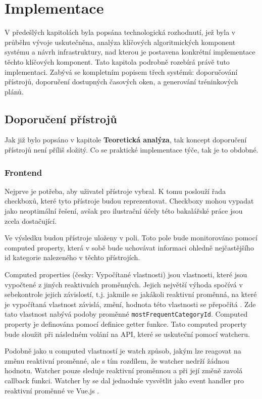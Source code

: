 \chapter{Implementace}
V předešlých kapitolách byla popsána technologická rozhodnutí, jež byla v průběhu vývoje uskutečněna, analýza klíčových algoritmických komponent systému a návrh infrastruktury, nad kterou je postavena konkrétní implementace těchto klíčových komponent. Tato kapitola podrobně rozebírá právě tuto implementaci. Zabývá se kompletním popisem třech systémů: doporučování přístrojů, doporučení dostupných časových oken, a generování tréninkových plánů.

\section{Doporučení přístrojů}
Jak již bylo popsáno v kapitole \textbf{Teoretická analýza}, tak koncept doporučení přístrojů není příliš složitý. Co se praktické implementace týče, tak je to obdobné.

\subsection{Frontend}
Nejprve je potřeba, aby uživatel přístroje vybral. K tomu poslouží řada checkboxů, které tyto přístroje budou reprezentovat. Checkboxy mohou vypadat jako neoptimální řešení, avšak pro ilustrační účely této bakalářské práce jsou zcela dostačující.

Ve výsledku budou přístroje uloženy v poli. Toto pole bude monitorováno pomocí computed property, která v sobě bude uchovávat informaci ohledně nejčastějšího id kategorie nalezeného v těchto přístrojích.

Computed properties (česky: Vypočítané vlastnosti) jsou vlastnosti, které jsou vypočtené z jiných reaktivních proměnných. Jejich největší výhoda spočívá v sebekontrole jejich závislostí, t.j. jakmile se jakákoli reaktivní proměnná, na které je vypočítaná vlastnost závislá, změní, hodnota této vlastnosti se přepočítá \cite{vuejsVuejsComputed}. Zde tato vlastnost nabývá podoby proměnné \texttt{mostFrequentCategoryId}. Computed property je definována pomocí definice getter funkce. Tato computed property bude sloužit při následném volání na API, které se uskuteční pomocí watcheru.

Podobně jako u computed vlastností je watch způsob, jakým lze reagovat na změnu reaktivní proměnné, ale s tím rozdílem, že watcher nedrží žádnou hodnotu. Watcher pouze sleduje reaktivní proměnnou a při její změně zavolá callback funkci. Watcher by se dal jednoduše vysvětlit jako event handler pro reaktivní proměnné ve Vue.js \cite{vuejsVuejsWatchers}.

